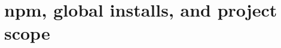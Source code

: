 \chapter{npm, global installs, and project scope}
\label{ch:npm-global-installs-and-project-scope}

